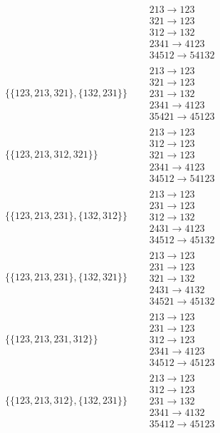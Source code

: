 \begin{tiny}
\begin{align}
\quad
&
\begin{matrix}
213 \to 123\\321 \to 123\\312 \to 132\\2341 \to 4123\\34512 \to 54132
\end{matrix}
\\
\{\{123, 213, 321\}, \{132, 231\}\}
\quad
&
\begin{matrix}
213 \to 123\\321 \to 123\\231 \to 132\\2341 \to 4123\\35421 \to 45123
\end{matrix}
\\
\{\{123, 213, 312, 321\}\}
\quad
&
\begin{matrix}
213 \to 123\\312 \to 123\\321 \to 123\\2341 \to 4123\\34512 \to 54123
\end{matrix}
\\
\{\{123, 213, 231\}, \{132, 312\}\}
\quad
&
\begin{matrix}
213 \to 123\\231 \to 123\\312 \to 132\\2431 \to 4123\\34512 \to 45132
\end{matrix}
\\
\{\{123, 213, 231\}, \{132, 321\}\}
\quad
&
\begin{matrix}
213 \to 123\\231 \to 123\\321 \to 132\\2431 \to 4132\\34521 \to 45132
\end{matrix}
\\
\{\{123, 213, 231, 312\}\}
\quad
&
\begin{matrix}
213 \to 123\\231 \to 123\\312 \to 123\\2341 \to 4123\\34512 \to 45123
\end{matrix}
\\
\{\{123, 213, 312\}, \{132, 231\}\}
\quad
&
\begin{matrix}
213 \to 123\\312 \to 123\\231 \to 132\\2341 \to 4132\\35412 \to 45123

\end{matrix}
\end{align}
\end{tiny}
